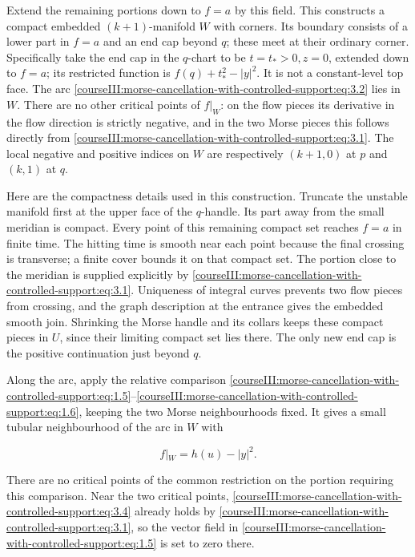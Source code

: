 Extend the remaining portions down to \(f=a\) by this field. This constructs a compact embedded \((k+1)\)-manifold \(W\) with corners. Its boundary consists of a lower part in \(f=a\) and an end cap beyond \(q\); these meet at their ordinary corner. Specifically take the end cap in the \(q\)-chart to be \(t=t_*>0,z=0\), extended down to \(f=a\); its restricted function is \(f(q)+t_*^2-|y|^2\). It is not a constant-level top face. The arc \eqref{courseIII:morse-cancellation-with-controlled-support:eq:3.2} lies in \(W\). There are no other critical points of \(f|_W\): on the flow pieces its derivative in the flow direction is strictly negative, and in the two Morse pieces this follows directly from \eqref{courseIII:morse-cancellation-with-controlled-support:eq:3.1}. The local negative and positive indices on \(W\) are respectively \((k+1,0)\) at \(p\) and \((k,1)\) at \(q\).

Here are the compactness details used in this construction. Truncate the unstable manifold first at the upper face of the \(q\)-handle. Its part away from the small meridian is compact. Every point of this remaining compact set reaches \(f=a\) in finite time. The hitting time is smooth near each point because the final crossing is transverse; a finite cover bounds it on that compact set. The portion close to the meridian is supplied explicitly by \eqref{courseIII:morse-cancellation-with-controlled-support:eq:3.1}. Uniqueness of integral curves prevents two flow pieces from crossing, and the graph description at the entrance gives the embedded smooth join. Shrinking the Morse handle and its collars keeps these compact pieces in \(U\), since their limiting compact set lies there. The only new end cap is the positive continuation just beyond \(q\).

Along the arc, apply the relative comparison \eqref{courseIII:morse-cancellation-with-controlled-support:eq:1.5}--\eqref{courseIII:morse-cancellation-with-controlled-support:eq:1.6}, keeping the two Morse neighbourhoods fixed. It gives a small tubular neighbourhood of the arc in \(W\) with

\begin{equation}
f|_W=h(u)-|y|^2.
\label{courseIII:morse-cancellation-with-controlled-support:eq:3.4}
\end{equation}

There are no critical points of the common restriction on the portion requiring this comparison. Near the two critical points, \eqref{courseIII:morse-cancellation-with-controlled-support:eq:3.4} already holds by \eqref{courseIII:morse-cancellation-with-controlled-support:eq:3.1}, so the vector field in \eqref{courseIII:morse-cancellation-with-controlled-support:eq:1.5} is set to zero there.

